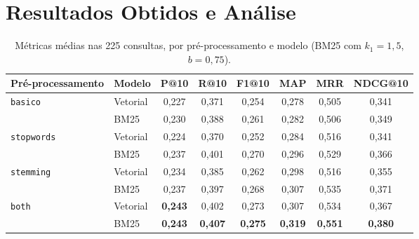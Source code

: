 \documentclass[10pt,a4paper]{article}
\begin{document}
\section{Resultados Obtidos e Análise}

\begin{table}[!htb]
  \centering\small
  \caption{Métricas médias nas 225 consultas, por pré-processamento e modelo (BM25 com $k_1=1{,}5$, $b=0{,}75$).}
  \label{tab:geral}
  \begin{tabular}{llcccccc}
    \toprule
    Pré-processamento & Modelo & P@10 & R@10 & F1@10 & MAP & MRR & NDCG@10\\
    \midrule
    \texttt{basico}    & Vetorial & 0,227 & 0,371 & 0,254 & 0,278 & 0,505 & 0,341\\
                       & BM25     & 0,230 & 0,388 & 0,261 & 0,282 & 0,506 & 0,349\\
    \texttt{stopwords} & Vetorial & 0,224 & 0,370 & 0,252 & 0,284 & 0,516 & 0,341\\
                       & BM25     & 0,237 & 0,401 & 0,270 & 0,296 & 0,529 & 0,366\\
    \texttt{stemming}  & Vetorial & 0,234 & 0,385 & 0,262 & 0,298 & 0,516 & 0,355\\
                       & BM25     & 0,237 & 0,397 & 0,268 & 0,307 & 0,535 & 0,371\\
    \texttt{both}      & Vetorial & \textbf{0,243} & 0,402 & 0,273 & 0,307 & 0,534 & 0,367\\
                       & BM25     & \textbf{0,243} & \textbf{0,407} & \textbf{0,275} & \textbf{0,319} & \textbf{0,551} & \textbf{0,380}\\
    \bottomrule
  \end{tabular}
\end{table}
\end{document}
